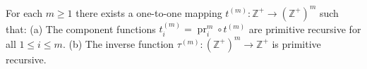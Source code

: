 For each $m \geqslant 1$ there exists a one-to-one mapping $t^{(m)}: \mathbb{Z}^+ \to (\mathbb{Z}^+)^m$ such that:
(a) The component functions $t_i^{(m)} = \operatorname{pr}_i^m \circ t^{(m)}$ are primitive recursive for all $1 \leqslant i \leqslant m$.
(b) The inverse function $\tau^{(m)}: (\mathbb{Z}^+)^m \to \mathbb{Z}^+$ is primitive recursive.